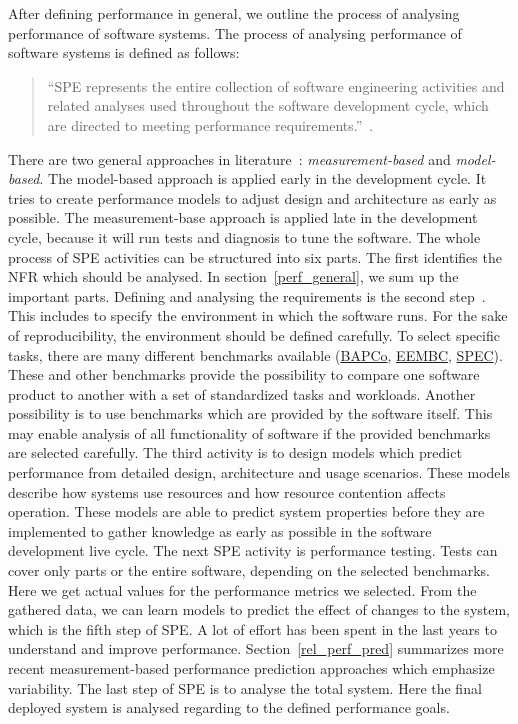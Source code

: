 After defining performance in general, we outline the process of analysing performance of software systems.
The process of analysing performance of software systems is defined as follows:
\begin{quote}
``\ac{SPE} represents the entire collection of software engineering activities and related analyses used throughout the software development cycle, which are directed to meeting performance requirements.''~\cite{woodside2007future}.
\end{quote}
There are two general approaches in literature~\cite{woodside2007future}: \textit{measurement-based} and \textit{model-based}. 
The model-based approach is applied early in the development cycle. 
It tries to create performance models to adjust design and architecture as early as possible. 
The measurement-base approach is applied late in the development cycle, because it will run tests and diagnosis to tune the software.
The whole process of \ac{SPE} activities can be structured into six parts. 
The first identifies the \ac{NFR} which should be analysed. In section~\ref{perf_general}, we sum up the important parts. 
Defining and analysing the requirements is the second step~\cite{woodside2007future}. 
This includes to specify the environment in which the software runs. 
For the sake of reproducibility, the environment should be defined carefully.  
To select specific tasks, there are many different benchmarks available (\href{https://bapco.com/}{BAPCo}, \href{https://www.eembc.org/}{EEMBC}, \href{http://www.spec.org/}{SPEC}). 
These and other benchmarks provide the possibility to compare one software product to another with a set of standardized tasks and workloads. 
Another possibility is to use benchmarks which are provided by the software itself. 
This may enable analysis of all functionality of software if the provided benchmarks are selected carefully. 
The third activity is to design models which predict performance from detailed design, architecture and usage scenarios. 
These models describe how systems use resources and how resource contention affects operation. 
These models are able to predict system properties before they are implemented to gather knowledge as early as possible in the software development live cycle.
The next \ac{SPE} activity is performance testing. 
Tests can cover only parts or the entire software, depending on the selected benchmarks. 
Here we get actual values for the performance metrics we selected.
From the gathered data, we can learn models to predict the effect of changes to the system, which is the fifth step of \ac{SPE}. 
A lot of effort has been spent in the last years to understand and improve performance. 
Section~\ref{rel_perf_pred} summarizes more recent measurement-based performance prediction approaches which emphasize variability.
The last step of \ac{SPE} is to analyse the total system.
Here the final deployed system is analysed regarding to the defined performance goals.


